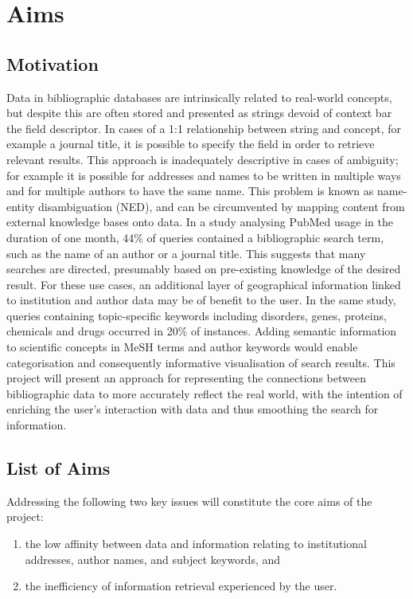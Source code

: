 \documentclass[PROP_AGutteridge_CS.tex]{subfiles}
\begin{document}
\chapter{Aims}
\section{Motivation}
Data in bibliographic databases are intrinsically related to real-world concepts, but despite this are often stored and presented as strings devoid of context bar the field descriptor. In cases of a 1:1 relationship between string and concept, for example a journal title, it is possible to specify the field in order to retrieve relevant results. This approach is inadequately descriptive in cases of ambiguity; for example it is possible for addresses and names to be written in multiple ways and for multiple authors to have the same name. This problem is known as name-entity disambiguation (NED), and can be circumvented by mapping content from external knowledge bases onto data\cite{hoffart}. In a study analysing PubMed usage in the duration of one month, 44\% of queries contained a bibliographic search term, such as the name of an author or a journal title\cite{dogan}. This suggests that many searches are directed, presumably based on pre-existing knowledge of the desired result. For these use cases, an additional layer of geographical information linked to institution and author data may be of benefit to the user. In the same study, queries containing topic-specific keywords including disorders, genes, proteins, chemicals and drugs occurred in 20\% of instances. Adding semantic information to scientific concepts in MeSH terms and author keywords would enable categorisation and consequently informative visualisation of search results. This project will present an approach for representing the connections between bibliographic data to more accurately reflect the real world, with the intention of enriching the user's interaction with data and thus smoothing the search for information. 

\section{List of Aims}
Addressing the following two key issues will constitute the core aims of the project:
\begin{enumerate}
\item the low affinity between data and information relating to institutional addresses, author names, and subject keywords, and
\item the inefficiency of information retrieval experienced by the user.
\end{enumerate}
\end{document}

